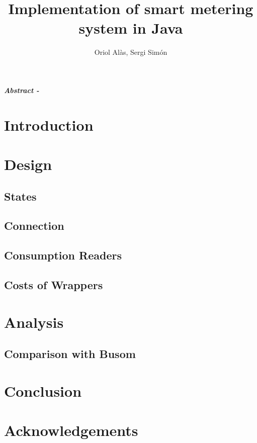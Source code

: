 \documentclass{article}
\title{Implementation of smart metering system in Java}
\author{Oriol Alàs, Sergi Simón}
\begin{document}
   \maketitle
   
   \textbf{\textit{Abstract - }}
   \section{Introduction}
   
   \section{Design}
   
   \subsection{States}
   
   \subsection{Connection}
   
   \subsection{Consumption Readers}
   
   \subsection{Costs of Wrappers}
   
   \label{wrapp:sec}
   \section{Analysis}
   
   \subsection{Comparison with Busom}
   \section{Conclusion}
   
   \section{Acknowledgements}
   
   
   
\end{document}
